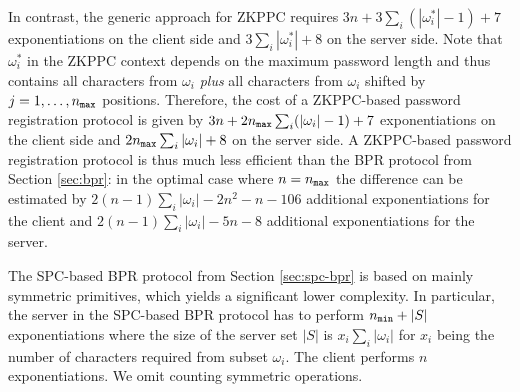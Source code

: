 In contrast, the generic approach for \ac{ZKPPC} requires $3n+3\sum_i (|\omega^\ast_i|-1)+7$ exponentiations on the client side and $3\sum_i |\omega^\ast_i|+8$ on the server side.
Note that $\omega^\ast_i$ in the \ac{ZKPPC} context depends on the maximum password length and thus contains all characters from $\omega_i$ \emph{plus} all characters from $\omega_i$ shifted by $j = 1,\ldots, {n_\mathtt{max}}$ positions.
Therefore, the cost of a \ac{ZKPPC}-based password registration protocol is given by $3n+2{n_\mathtt{max}}\sum_i (|\omega_i|-1)+7$ exponentiations on the client side and $2{n_\mathtt{max}}\sum_i |\omega_i|+8$ on the server side. 
A \ac{ZKPPC}-based password registration protocol is thus much less efficient than the \ac{BPR} protocol from Section \ref{sec:bpr}: in the optimal case where $n={n_\mathtt{max}}$ the difference can be estimated by  $2(n-1)\sum_i|\omega_i| - 2n^2 - n - 106$ additional exponentiations for the client and $2(n-1)\sum_i|\omega_i| - 5n - 8$ additional exponentiations for the server.

The \ac{SPC}-based \ac{BPR} protocol from Section \ref{sec:spc-bpr} is based on mainly symmetric primitives, which yields a significant lower complexity.
In particular, the server in the \ac{SPC}-based \ac{BPR} protocol has to perform ${n_\mathtt{min}}+|S|$ exponentiations where the size of the server set $|S|$ is $x_i\sum_i |\omega_i|$ for $x_i$ being the number of characters required from subset $\omega_i$.
The client performs $n$ exponentiations.
We omit counting symmetric operations.


